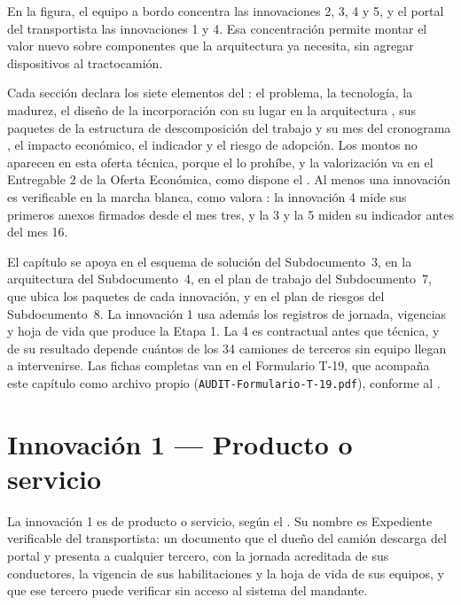 
En la figura, el equipo a bordo concentra las innovaciones 2, 3, 4 y 5, y el portal del transportista
las innovaciones 1 y 4. Esa concentración permite montar el valor nuevo sobre componentes que la
arquitectura ya necesita, sin agregar dispositivos al tractocamión.

Cada sección declara los siete elementos del : el problema, la tecnología, la madurez, el
diseño de la incorporación con su lugar en la arquitectura , sus paquetes de la
estructura de descomposición del trabajo y su mes del cronograma , el impacto
económico, el indicador y el riesgo de adopción. Los montos no aparecen en esta oferta técnica, porque
el  lo prohíbe, y la valorización va en el Entregable 2 de la Oferta Económica, como
dispone el . Al menos una innovación es verificable en la marcha blanca, como valora
: la innovación 4 mide sus primeros anexos firmados desde el mes tres, y la 3 y
la 5 miden su indicador antes del mes 16.

El capítulo se apoya en el esquema de solución del Subdocumento~3, en la arquitectura del
Subdocumento~4, en el plan de trabajo del Subdocumento~7, que ubica los paquetes de cada innovación, y
en el plan de riesgos del Subdocumento~8. La innovación 1 usa además los registros de jornada, vigencias y
hoja de vida que produce la Etapa 1. La 4 es contractual antes que técnica, y de su resultado depende cuántos de los 34
camiones de terceros sin equipo llegan a intervenirse. Las fichas completas van en el Formulario T-19, que acompaña
este capítulo como archivo propio (\texttt{AUDIT-Formulario-T-19.pdf}), conforme al
.

\section{Innovación 1 — Producto o servicio}\label{sec:13-innovacion-1}

La innovación 1 es de producto o servicio, según el . Su nombre es Expediente verificable
del transportista: un documento que el dueño del camión descarga del portal y presenta a cualquier
tercero, con la jornada acreditada de sus conductores, la vigencia de sus habilitaciones y la hoja de
vida de sus equipos, y que ese tercero puede verificar sin acceso al sistema del mandante.

